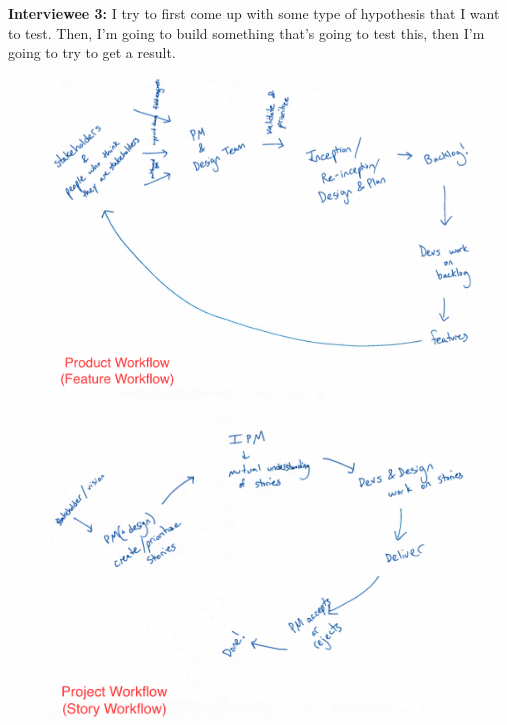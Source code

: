\textbf{Interviewee 3:} I try to first come up with some type of hypothesis that I want to test. Then, I'm going to build something that's going to test this, then I'm going to try to get a result. 


\begin{figure}[H]
\centering
\includegraphics[width=6.5in]{interviews/drawings/2015_07_31a.png}
\caption{}
\end{figure}

\begin{figure}[H]
\centering
\includegraphics[width=6.5in]{interviews/drawings/2015_07_31b.png}
\caption{}
\end{figure}

